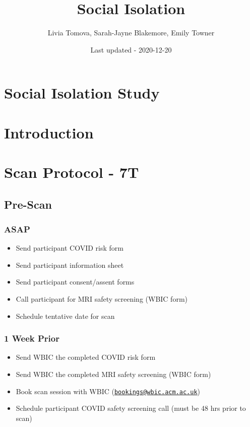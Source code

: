 \documentclass[
]{book}
\title{Social Isolation}
\author{Livia Tomova, Sarah-Jayne Blakemore, Emily Towner}
\date{Last updated - 2020-12-20}
\providecommand{\tightlist}{%
  \setlength{\itemsep}{0pt}\setlength{\parskip}{0pt}}
\begin{document}
\maketitle

{
\setcounter{tocdepth}{1}
\tableofcontents
}
\hypertarget{social-isolation-study}{%
\chapter{Social Isolation Study}\label{social-isolation-study}}

\hypertarget{intro}{%
\chapter{Introduction}\label{intro}}

\hypertarget{scan-protocol}{%
\chapter{Scan Protocol - 7T}\label{scan-protocol}}

\hypertarget{pre-scan}{%
\section{Pre-Scan}\label{pre-scan}}

\hypertarget{asap}{%
\subsection{ASAP}\label{asap}}

\begin{itemize}
\tightlist
\item
  Send participant COVID risk form
\item
  Send participant information sheet
\item
  Send participant consent/assent forms
\item
  Call participant for MRI safety screening (WBIC form)
\item
  Schedule tentative date for scan
\end{itemize}

\hypertarget{week-prior}{%
\subsection{1 Week Prior}\label{week-prior}}

\begin{itemize}
\tightlist
\item
  Send WBIC the completed COVID risk form
\item
  Send WBIC the completed MRI safety screening (WBIC form)
\item
  Book scan session with WBIC (\href{mailto:bookings@wbic.acm.ac.uk}{\nolinkurl{bookings@wbic.acm.ac.uk}})
\item
  Schedule participant COVID safety screening call (must be 48 hrs prior to scan)
\end{itemize}
\end{document}
